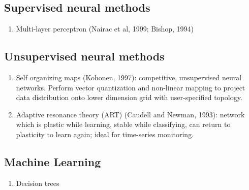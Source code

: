 \documentclass[11pt]{article}
\begin{document}
\subsection{Supervised neural methods}

\begin{enumerate}
\item Multi-layer perceptron (Nairac et al, 1999; Bishop, 1994)
\end{enumerate}

\subsection{Unsupervised neural methods}

\begin{enumerate}
\item Self organizing maps (Kohonen, 1997): competitive, unsupervised neural networks. Perform vector quantization and non-linear mapping to project data distribution onto lower dimension grid with user-specified topology.
\item Adaptive resonance theory (ART) (Caudell and Newman, 1993): network which is plastic while learning, stable while classifying, can return to plasticity to learn again; ideal for time-series monitoring.
\end{enumerate}

\subsection{Machine Learning}

\begin{enumerate}
\item Decision trees
\end{enumerate}
\end{document}
